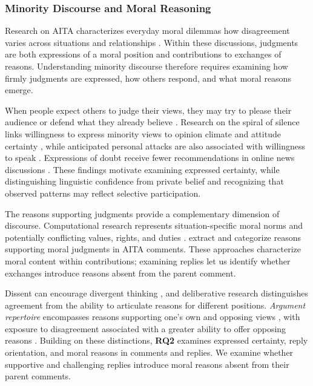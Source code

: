 \subsubsection*{Minority Discourse and Moral Reasoning}

Research on AITA characterizes everyday moral dilemmas 
how disagreement varies across situations and relationships
\cite{nguyen2022mapping,shi2025moral}. Within these discussions,
judgments are both expressions of a moral position and contributions
to exchanges of reasons. Understanding minority discourse therefore
requires examining how firmly judgments are expressed, how others
respond, and what moral reasons emerge.

When people expect others to judge their views, they may try to
please their audience or defend what they already believe
\cite{tetlock1989strategies}.
Research on the spiral
of silence links willingness to express minority views to opinion
climate and attitude certainty \cite{matthes2010spiral}, while
anticipated personal attacks are also associated with willingness
to speak \cite{neubaum2018sanctions}. Expressions of doubt receive
fewer recommendations in online news discussions
\cite{evans2023doubt}. These findings motivate examining expressed
certainty, while distinguishing linguistic confidence from private
belief and recognizing that observed patterns may reflect selective
participation.

The reasons supporting judgments provide a complementary dimension
of discourse. Computational research represents situation-specific
moral norms \cite{forbes2020social} and potentially conflicting
values, rights, and duties \cite{sorensen2024value}.
\citet{xi2024morality} extract and categorize 
reasons supporting moral judgments
in AITA comments. These approaches characterize moral content
within contributions; examining replies let us identify %
whether exchanges introduce reasons absent from the parent comment.

Dissent can encourage divergent thinking \cite{nemeth1986differential},
and deliberative research distinguishes agreement from the ability
to articulate reasons for different positions.
\emph{Argument repertoire} encompasses reasons supporting one's own
and opposing views \cite{cappella2002argument}, with exposure to
disagreement associated with a greater ability to offer opposing
reasons \cite{price2002disagreement}. Building on these distinctions,
\textbf{RQ2} examines expressed certainty, reply orientation, and
moral reasons in comments and replies. 
We examine whether supportive and challenging replies introduce moral reasons absent from their parent comments.


